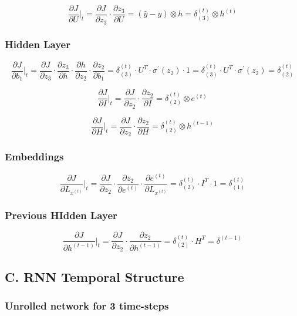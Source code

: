 \documentclass{article}
\begin{document}
$$
	\frac {\partial J}{\partial U} \Big|_t = \frac {\partial J}{\partial z_3} \cdot \frac {\partial z_3}{\partial U} = (\hat y - y) \otimes h = \delta_{(3)}^{(t)} \otimes h^{(t)}
$$

\subsubsection*{Hidden Layer}
$$
	\frac {\partial J}{\partial b_1} \Big|_t= \frac {\partial J}{\partial z_3} \cdot \frac {\partial z_3}{\partial h} \cdot \frac {\partial h}{\partial z_2} \cdot \frac {\partial z_2}{\partial b_1} = \delta_{(3)}^{(t)} \cdot U^{T} \cdot \sigma^{'}(z_2) \cdot 1= \delta_{(3)}^{(t)} \cdot U^{T} \cdot \sigma^{'}(z_2) = \delta_{(2)}^{(t)}
$$

$$
	\frac {\partial J}{\partial I}\Big|_t = \frac {\partial J}{\partial z_2} \cdot \frac {\partial z_2}{\partial I} = \delta_{(2)}^{(t)} \otimes {e^{(t)}}
$$

$$
	\frac {\partial J}{\partial H}\Big|_t = \frac {\partial J}{\partial z_2} \cdot \frac {\partial z_2}{\partial H} = \delta_{(2)}^{(t)} \otimes {h^{(t-1)}}
$$

\subsubsection*{Embeddings}
$$
	\frac {\partial J}{\partial L_{x^{(t)}}}\Big|_t = \frac {\partial J}{\partial z_2} \cdot \frac{\partial z_2}{\partial e^{(t)}}\cdot \frac {\partial e^{(t)}}{\partial  L_{x^{(t)}}} = \delta_{(2)}^{(t)} \cdot I^{T} \cdot 1 = \delta_{(1)}^{(t)}
$$

\subsubsection*{Previous HIdden Layer}
$$
	\frac {\partial J}{\partial h^{(t-1)}}\Big|_t = \frac {\partial J}{\partial z_2} \cdot \frac {\partial z_2}{\partial h^{(t-1)}} = \delta_{(2)}^{(t)} \cdot H^{T} = \delta^{(t-1)}
$$

\subsection*{C. RNN Temporal Structure}
\subsubsection*{Unrolled network for 3 time-steps}
\end{document}
